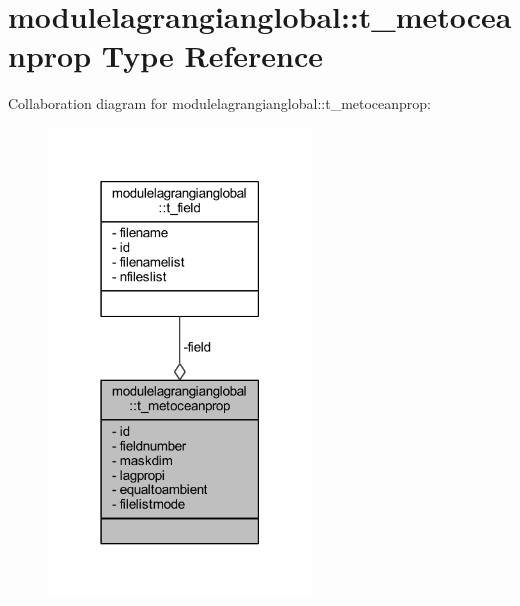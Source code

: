 \hypertarget{structmodulelagrangianglobal_1_1t__metoceanprop}{}\section{modulelagrangianglobal\+:\+:t\+\_\+metoceanprop Type Reference}
\label{structmodulelagrangianglobal_1_1t__metoceanprop}


Collaboration diagram for modulelagrangianglobal\+:\+:t\+\_\+metoceanprop\+:\nopagebreak
\begin{figure}[H]
\begin{center}
\leavevmode
\includegraphics[width=198pt]{structmodulelagrangianglobal_1_1t__metoceanprop__coll__graph}
\end{center}
\end{figure}
